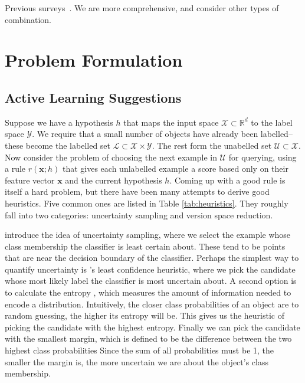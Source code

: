 \documentclass[fleqn,10pt,lineno]{wlpeerj} %
\newcommand{\X}{\mathcal{X}}
\newcommand{\Y}{\mathcal{Y}}
\newcommand{\Unlabelled}{\mathcal{U}}
\newcommand{\Labelled}{\mathcal{L}}
\begin{document}
Previous surveys~\cite{baram04, hsu15}.
We are more comprehensive, and consider other types of combination.

\section*{Problem Formulation}

\subsection*{Active Learning Suggestions}


Suppose we have a hypothesis $h$ that maps the input space $\X \subset
\mathbb{R}^d$ to the label space $\Y$. We require that a small number of
objects have already been labelled--these become the labelled set $\Labelled
\subset \X \times \Y$. The rest form the unabelled set $\Unlabelled \subset
\X$. Now consider the problem of choosing the next example in $\Unlabelled$ for
querying, using a rule $r(\bm{x}; h)$ that gives each unlabelled example a
score based only on their feature vector $\bm{x}$ and the current hypothesis
$h$. Coming up with a good rule is itself a hard problem, but there have been
many attempts to derive good heuristics. Five common ones are listed in Table
\ref{tab:heuristics}. They roughly fall into two categories: uncertainty
sampling and version space reduction.

\cite{lewis94} introduce the idea of uncertainty sampling, where we select the
example whose class membership the classifier is least certain about. These
tend to be points that are near the decision boundary of the classifier.
Perhaps the simplest way to quantify uncertainty is \cite{culotta05}'s least
confidence heuristic, where we pick the candidate whose most likely label the
classifier is most uncertain about. A second option is to calculate the entropy
\citep{shannon48}, which measures the amount of information needed to encode a
distribution. Intuitively, the closer class probabilities of an object are to
random guessing, the higher its entropy will be. This gives us the heuristic of
picking the candidate with the highest entropy. Finally we can pick the
candidate with the smallest margin, which is defined to be the difference
between the two highest class probabilities \citep{scheffer01} Since the sum of
all probabilities must be 1, the smaller the margin is, the more uncertain we
are about the object's class membership.
\end{document}
